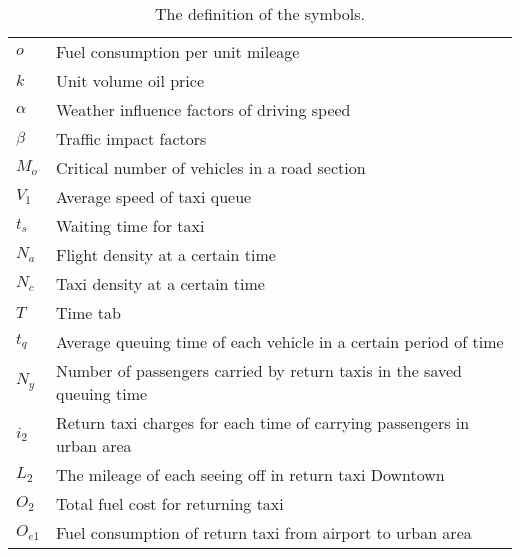 \begin{table}[H]
\begin{tabular}{|l|l|}
                $o$ & Fuel consumption per unit mileage\\

                $k$ & Unit volume oil price \\

                $\alpha$ & Weather influence factors of driving speed \\

                $\beta$ & Traffic impact factors\\
                
                $M_o$ & Critical number of vehicles in a road section\\
                
                $V_1$ & Average speed of taxi queue\\
                
                $t_s$ & Waiting time for taxi\\
                
                $N_a$ & Flight density at a certain time\\
                
                $N_c$ & Taxi density at a certain time\\
                
                $T$ & Time tab\\
                
                $t_q$ & Average queuing time of each vehicle in a certain period of time\\
                
                $N_y$ & Number of passengers carried by return taxis in the saved queuing time\\
                
                $i_2$ & Return taxi charges for each time of carrying passengers in urban area\\
                
                $L_2$ & The mileage of each seeing off in return taxi Downtown\\
                
                $O_2$ & Total fuel cost for returning taxi\\
                
                $O_{e1}$ & Fuel consumption of return taxi from airport to urban area\\
                
                
                \hline
                \end{tabular}
                \caption{The definition of the symbols.}  \label{tab.symbol2}
\end{table}

